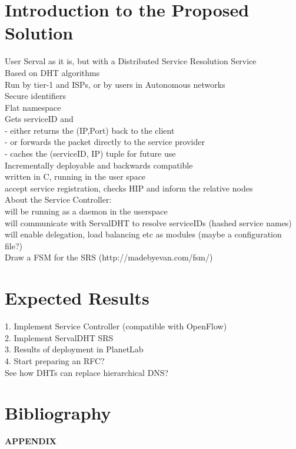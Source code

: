 \documentclass[12pt,a4paper,oneside]{article}
\begin{document}
\section{Introduction to the Proposed Solution}
User Serval as it is, but with a Distributed Service Resolution Service
\\Based on DHT algorithms
\\Run by tier-1 and ISPs, or by users in Autonomous networks
\\Secure identifiers
\\Flat namespace
\\Gets serviceID and
\\- either returns the (IP,Port) back to the client
\\- or forwards the packet directly to the service provider
\\- caches the (serviceID, IP) tuple for future use
\\Incrementally deployable and backwards compatible
\\written in C, running in the user space
\\accept service registration, checks HIP and inform the relative nodes
\\About the Service Controller:
\\will be running as a daemon in the userspace
\\will communicate with ServalDHT to resolve serviceIDs (hashed service names)
\\will enable delegation, load balancing etc as modules (maybe a configuration file?)
\\Draw a FSM for the SRS  (http://madebyevan.com/fsm/)


\newpage
\section{Expected Results}
1. Implement Service Controller (compatible with OpenFlow)
\\2. Implement ServalDHT SRS
\\3. Results of deployment in PlanetLab
\\4. Start preparing an RFC?
\\See how DHTs can replace hierarchical DNS?


\newpage
\section{Bibliography}
\nocite{*}

\renewcommand{\refname}{}



\newpage
\thispagestyle{empty}
{\Huge \bf \noindent APPENDIX}
\newpage
\end{document}
